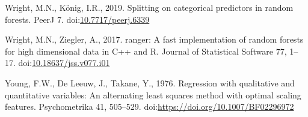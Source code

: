 \documentclass[smallextended]{svjour3}       %
\newlength{\cslhangindent}
\newlength{\cslentryspacingunit} %
\newenvironment{CSLReferences}[2] %
 {%
  \setlength{\parindent}{0pt}
  \ifodd #1
  \let\oldpar\par
  \def\par{\hangindent=\cslhangindent\oldpar}
  \fi
  \setlength{\parskip}{#2\cslentryspacingunit}
 }%
 {}
\begin{document}
\begin{CSLReferences}{1}{0}
\leavevmode{}%
Wright, M.N., König, I.R., 2019. Splitting on categorical predictors in random forests. PeerJ 7. doi:\href{https://doi.org/10.7717/peerj.6339}{10.7717/peerj.6339}

\leavevmode{}%
Wright, M.N., Ziegler, A., 2017. {ranger}: A fast implementation of random forests for high dimensional data in {C++} and {R}. Journal of Statistical Software 77, 1--17. doi:\href{https://doi.org/10.18637/jss.v077.i01}{10.18637/jss.v077.i01}

\leavevmode{}%
Young, F.W., De Leeuw, J., Takane, Y., 1976. Regression with qualitative and quantitative variables: An alternating least squares method with optimal scaling features. Psychometrika 41, 505--529. doi:\url{https://doi.org/10.1007/BF02296972}

\end{CSLReferences}



\end{document}
